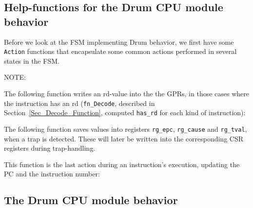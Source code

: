 
\subsection{Help-functions for the Drum CPU module behavior}

\label{Sec_Drum_FSM_help_fns}

Before we look at the FSM implementing Drum behavior, we first have
some \verb|Action| functions that encapsulate some common actions
performed in several states in the FSM.

\vspace{2ex}

NOTE:

The following function writes an rd-value into the the GPRs, in those
cases where the instruction has an rd (\verb|fn_Decode|, described in
Section~\ref{Sec_Decode_Function}, computed \verb|has_rd| for each
kind of instruction):



The following function saves values into registers \verb|rg_epc|,
\verb|rg_cause| and \verb|rg_tval|, when a trap is detected.  These
will later be written into the corresponding CSR registers during
trap-handling.



This function is the last action during an instruction's execution,
updating the PC and the instruction number:




\subsection{The Drum CPU module behavior}

\label{Sec_Drum_CPU_module_behavior}


